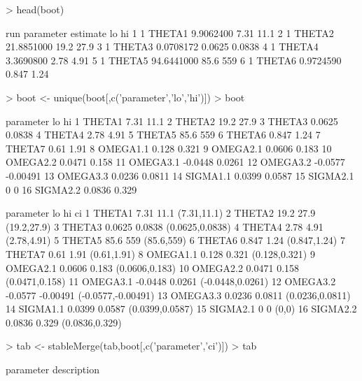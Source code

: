\begin{Schunk}
\begin{Sinput}
> head(boot)
\end{Sinput}
\begin{Soutput}
  run parameter   estimate     lo     hi
1   1    THETA1  9.9062400   7.31   11.1
2   1    THETA2 21.8851000   19.2   27.9
3   1    THETA3  0.0708172 0.0625 0.0838
4   1    THETA4  3.3690800   2.78   4.91
5   1    THETA5 94.6441000   85.6    559
6   1    THETA6  0.9724590  0.847   1.24
\end{Soutput}
\begin{Sinput}
> boot <- unique(boot[,c('parameter','lo','hi')])
> boot
\end{Sinput}
\begin{Soutput}
   parameter      lo       hi
1     THETA1    7.31     11.1
2     THETA2    19.2     27.9
3     THETA3  0.0625   0.0838
4     THETA4    2.78     4.91
5     THETA5    85.6      559
6     THETA6   0.847     1.24
7     THETA7    0.61     1.91
8   OMEGA1.1   0.128    0.321
9   OMEGA2.1  0.0606    0.183
10  OMEGA2.2  0.0471    0.158
11  OMEGA3.1 -0.0448   0.0261
12  OMEGA3.2 -0.0577 -0.00491
13  OMEGA3.3  0.0236   0.0811
14  SIGMA1.1  0.0399   0.0587
15  SIGMA2.1       0        0
16  SIGMA2.2  0.0836    0.329
\end{Soutput}
\begin{Soutput}
   parameter      lo       hi                 ci
1     THETA1    7.31     11.1        (7.31,11.1)
2     THETA2    19.2     27.9        (19.2,27.9)
3     THETA3  0.0625   0.0838    (0.0625,0.0838)
4     THETA4    2.78     4.91        (2.78,4.91)
5     THETA5    85.6      559         (85.6,559)
6     THETA6   0.847     1.24       (0.847,1.24)
7     THETA7    0.61     1.91        (0.61,1.91)
8   OMEGA1.1   0.128    0.321      (0.128,0.321)
9   OMEGA2.1  0.0606    0.183     (0.0606,0.183)
10  OMEGA2.2  0.0471    0.158     (0.0471,0.158)
11  OMEGA3.1 -0.0448   0.0261   (-0.0448,0.0261)
12  OMEGA3.2 -0.0577 -0.00491 (-0.0577,-0.00491)
13  OMEGA3.3  0.0236   0.0811    (0.0236,0.0811)
14  SIGMA1.1  0.0399   0.0587    (0.0399,0.0587)
15  SIGMA2.1       0        0              (0,0)
16  SIGMA2.2  0.0836    0.329     (0.0836,0.329)
\end{Soutput}
\begin{Sinput}
> tab <- stableMerge(tab,boot[,c('parameter','ci')])
> tab
\end{Sinput}
\begin{Soutput}
   parameter                                   description

\end{Soutput}
\end{Schunk}
